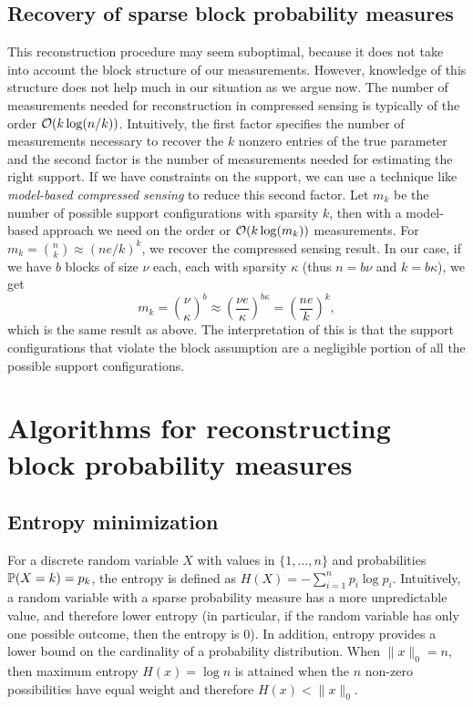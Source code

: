\documentclass{article} %
\begin{document}
\subsection{Recovery of sparse block probability measures}
This reconstruction procedure may seem suboptimal, because it does not
take into account the block structure of our measurements.
However,
knowledge of this structure does not help much in our situation as we
argue now. The number of measurements needed for reconstruction in
compressed sensing is typically of the order
$\O(k\log(n/k))$.
Intuitively, the first factor specifies the number
of measurements necessary to recover the $k$ nonzero entries of the
true parameter and the second factor is the number of measurements
needed for estimating the right support. If we have constraints on the
support, we can use a technique like \emph{model-based compressed
  sensing} \cite{model_sensing} to reduce this second factor.  
Let $m_k$ be the number of possible support configurations with
sparsity $k$, then with a model-based approach we need on the order or
$\O(k\log(m_k))$ measurements.
For $m_k = {n\choose k}\approx (ne/k)^k$, we recover the compressed
sensing result.
In our case, if we have $b$ blocks of size $\nu$ each, each with
sparsity $\kappa$ (thus $n = b\nu$ and $k=b\kappa$), we get
\begin{equation*}
m_k = {\nu \choose \kappa}^b \approx \left(\frac{\nu
  e}{\kappa}\right)^{b\kappa} = \left(\frac{ne}{k}\right)^k,
\end{equation*}
which is the same result as above. The interpretation of this is that
the support configurations that violate the block assumption are a
negligible portion of all the possible support configurations.


\section{Algorithms for reconstructing block probability measures}
\subsection{Entropy minimization}
For a discrete random variable $X$ with values in $\{1, \dots, n\}$ and probabilities $\P(X = k) = p_k$, the entropy is defined as $H(X)  = -\sum_{i=1}^{n} p_i \log p_i$.
Intuitively, a random variable with a sparse probability measure has a more unpredictable value, and therefore lower entropy (in particular, if the random variable has only one possible outcome, then the entropy is 0).
In addition, entropy provides a lower bound on the cardinality of a probability distribution. When $\|x\|_0 = n$, then maximum entropy $H(x) = \log n$ is attained when the $n$ non-zero possibilities have equal weight and therefore $H(x) < \|x\|_0$.
\end{document}
